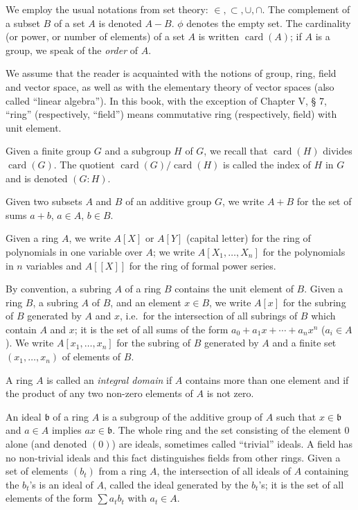 We employ the usual notations from set theory: $\in,\subset,\cup,\cap$.
The complement of a subset $B$ of a set $A$ is denoted $A-B$. $\phi$ denotes
the empty set. The cardinality (or power, or number of elements) of a set
$A$ is written $\operatorname{card}(A)$; if $A$ is a group, we speak of the
\emph{order} of $A$.

We assume that the reader is acquainted with the notions of group, ring,
field and vector space, as well as with the elementary theory of vector
spaces (also called ``linear algebra''). In this book, with the exception of
Chapter V, § 7, ``ring'' (respectively, ``field'') means commutative ring
(respectively, field) with unit element.

Given a finite group $G$ and a subgroup $H$ of $G$, we recall that
$\operatorname{card}(H)$ divides $\operatorname{card}(G)$. The quotient
$\operatorname{card}(G)/\operatorname{card}(H)$ is called the index of $H$
in $G$ and is denoted $(G:H)$.

Given two subsets $A$ and $B$ of an additive group $G$, we write $A+B$ for
the set of sums $a+b$, $a\in A$, $b\in B$.

Given a ring $A$, we write $A[X]$ or $A[Y]$ (capital letter) for the ring of
polynomials in one variable over $A$; we write $A[X_{1},\ldots,X_{n}]$ for
the polynomials in $n$ variables and $A[[X]]$ for the ring of formal power
series.

By convention, a subring $A$ of a ring $B$ contains the unit element of $B$.
Given a ring $B$, a subring $A$ of $B$, and an element $x\in B$, we write
$A[x]$ for the subring of $B$ generated by $A$ and $x$, i.e.\ for the
intersection of all subrings of $B$ which contain $A$ and $x$; it is the set
of all sums of the form $a_{0}+a_{1}x+\cdots+a_{n}x^{n}$ ($a_{i}\in A$). We
write $A[x_{1},\ldots,x_{n}]$ for the subring of $B$ generated by $A$ and a
finite set $(x_{1},\ldots,x_{n})$ of elements of $B$.

A ring $A$ is called an \emph{integral domain} if $A$ contains more than one
element and if the product of any two non-zero elements of $A$ is not zero.

An ideal $\mathfrak{b}$ of a ring $A$ is a subgroup of the additive group of
$A$ such that $x\in\mathfrak{b}$ and $a\in A$ implies $ax\in\mathfrak{b}$.
The whole ring and the set consisting of the element $0$ alone (and denoted
$(0)$) are ideals, sometimes called ``trivial'' ideals. A field has no
non-trivial ideals and this fact distinguishes fields from other rings.
Given a set of elements $(b_{t})$ from a ring $A$, the intersection of all
ideals of $A$ containing the $b_{t}$'s is an ideal of $A$, called the ideal
generated by the $b_{t}$'s; it is the set of all elements of the form
$\sum a_{t}b_{t}$ with $a_{t}\in A$.


